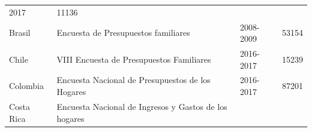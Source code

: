 \documentclass[12pt,spanish,]{book}
\begin{document}
\begin{longtable}[]{@{}llll@{}}
\begin{minipage}[t]{0.08\columnwidth}
2017\strut
\end{minipage} & \begin{minipage}[t]{0.14\columnwidth}\raggedright
11136\strut
\end{minipage}\tabularnewline
\begin{minipage}[t]{0.17\columnwidth}\raggedright
Brasil\strut
\end{minipage} & \begin{minipage}[t]{0.50\columnwidth}\raggedright
Encuesta de Presupuestos familiares\strut
\end{minipage} & \begin{minipage}[t]{0.08\columnwidth}\raggedright
2008-2009\strut
\end{minipage} & \begin{minipage}[t]{0.14\columnwidth}\raggedright
53154\strut
\end{minipage}\tabularnewline
\begin{minipage}[t]{0.17\columnwidth}\raggedright
Chile\strut
\end{minipage} & \begin{minipage}[t]{0.50\columnwidth}\raggedright
VIII Encuesta de Presupuestos Familiares\strut
\end{minipage} & \begin{minipage}[t]{0.08\columnwidth}\raggedright
2016-2017\strut
\end{minipage} & \begin{minipage}[t]{0.14\columnwidth}\raggedright
15239\strut
\end{minipage}\tabularnewline
\begin{minipage}[t]{0.17\columnwidth}\raggedright
Colombia\strut
\end{minipage} & \begin{minipage}[t]{0.50\columnwidth}\raggedright
Encuesta Nacional de Presupuestos de los Hogares\strut
\end{minipage} & \begin{minipage}[t]{0.08\columnwidth}\raggedright
2016-2017\strut
\end{minipage} & \begin{minipage}[t]{0.14\columnwidth}\raggedright
87201\strut
\end{minipage}\tabularnewline
\begin{minipage}[t]{0.17\columnwidth}\raggedright
Costa Rica\strut
\end{minipage} & \begin{minipage}[t]{0.50\columnwidth}\raggedright
Encuesta Nacional de Ingresos y Gastos de los hogares\strut

\end{minipage}
\end{longtable}
\end{document}
